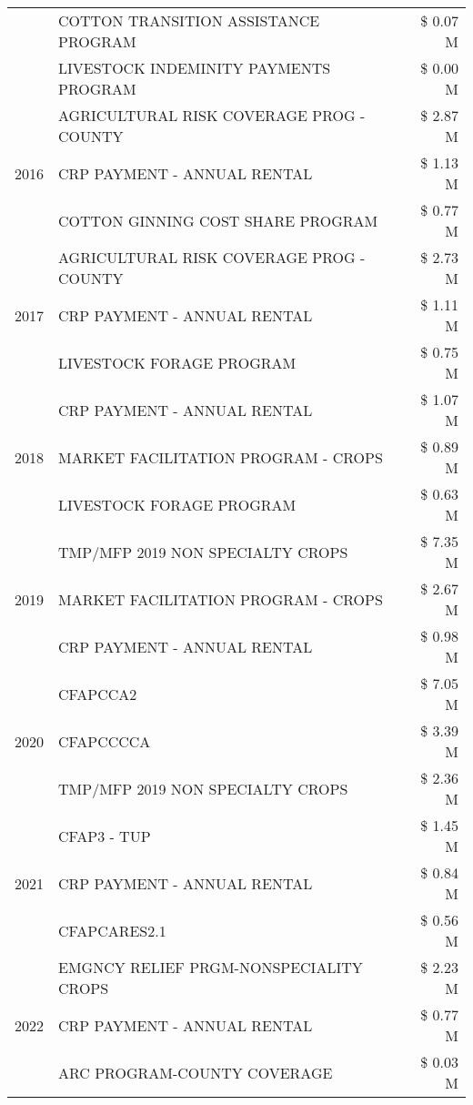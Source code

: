 \begin{tabular}{llr}
 & COTTON TRANSITION ASSISTANCE PROGRAM & \$ 0.07 M \\
 & LIVESTOCK INDEMINITY PAYMENTS PROGRAM & \$ 0.00 M \\
\cline{1-3}
\multirow[t]{3}{*}{2016} & AGRICULTURAL RISK COVERAGE PROG - COUNTY & \$ 2.87 M \\
 & CRP PAYMENT - ANNUAL RENTAL & \$ 1.13 M \\
 & COTTON GINNING COST SHARE PROGRAM & \$ 0.77 M \\
\cline{1-3}
\multirow[t]{3}{*}{2017} & AGRICULTURAL RISK COVERAGE PROG - COUNTY & \$ 2.73 M \\
 & CRP PAYMENT - ANNUAL RENTAL & \$ 1.11 M \\
 & LIVESTOCK FORAGE PROGRAM & \$ 0.75 M \\
\cline{1-3}
\multirow[t]{3}{*}{2018} & CRP PAYMENT - ANNUAL RENTAL & \$ 1.07 M \\
 & MARKET FACILITATION PROGRAM - CROPS & \$ 0.89 M \\
 & LIVESTOCK FORAGE PROGRAM & \$ 0.63 M \\
\cline{1-3}
\multirow[t]{3}{*}{2019} & TMP/MFP 2019 NON SPECIALTY CROPS & \$ 7.35 M \\
 & MARKET FACILITATION PROGRAM - CROPS & \$ 2.67 M \\
 & CRP PAYMENT - ANNUAL RENTAL & \$ 0.98 M \\
\cline{1-3}
\multirow[t]{3}{*}{2020} & CFAPCCA2 & \$ 7.05 M \\
 & CFAPCCCCA & \$ 3.39 M \\
 & TMP/MFP 2019 NON SPECIALTY CROPS & \$ 2.36 M \\
\cline{1-3}
\multirow[t]{3}{*}{2021} & CFAP3 - TUP & \$ 1.45 M \\
 & CRP PAYMENT - ANNUAL RENTAL & \$ 0.84 M \\
 & CFAPCARES2.1 & \$ 0.56 M \\
\cline{1-3}
\multirow[t]{3}{*}{2022} & EMGNCY RELIEF PRGM-NONSPECIALITY CROPS & \$ 2.23 M \\
 & CRP PAYMENT - ANNUAL RENTAL & \$ 0.77 M \\
 & ARC PROGRAM-COUNTY COVERAGE & \$ 0.03 M \\
\cline{1-3}
\bottomrule
\end{tabular}
